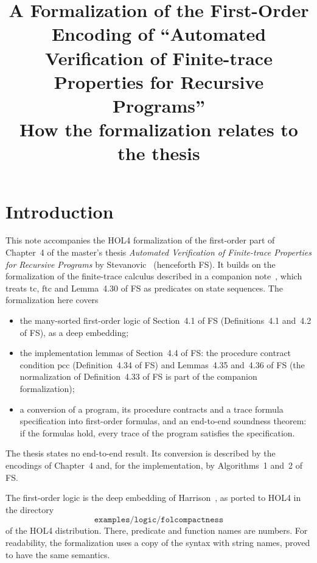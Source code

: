 \documentclass[11pt]{article}
\title{A Formalization of the First-Order Encoding of
  ``Automated Verification of Finite-trace Properties for Recursive
  Programs''\\[0.3em]
  \large How the formalization relates to the thesis}
\author{}
\date{}
\newcommand{\tc}{\mathrm{tc}}
\newcommand{\ftc}{\mathrm{ftc}}
\newcommand{\pcc}{\mathrm{pcc}}
\newcommand{\Th}[1]{#1 of FS}
\theoremstyle{plain}
\theoremstyle{definition}
\theoremstyle{remark}
\begin{document}
\maketitle

\section{Introduction}

This note accompanies the HOL4 formalization of the first-order part of
Chapter~4 of the master's thesis \emph{Automated Verification of
Finite-trace Properties for Recursive Programs} by Stevanovic~\cite{FS}
(henceforth FS). It builds on the formalization of the finite-trace
calculus described in a companion note~\cite{V}, which treats $\tc$,
$\ftc$ and \Th{Lemma~4.30} as predicates on state sequences. The
formalization here covers
\begin{itemize}
\item the many-sorted first-order logic of \Th{Section~4.1}
  (\Th{Definitions~4.1 and~4.2}), as a deep embedding;
\item the implementation lemmas of \Th{Section~4.4}: the procedure contract
  condition $\pcc$ (\Th{Definition~4.34}) and \Th{Lemmas~4.35 and~4.36}
  (the normalization of \Th{Definition~4.33} is part of the companion
  formalization);
\item a conversion of a program, its procedure contracts and a trace
  formula specification into first-order formulas, and an end-to-end
  soundness theorem: if the formulas hold, every trace of the program
  satisfies the specification.
\end{itemize}
The thesis states no end-to-end result. Its conversion is described by
the encodings of Chapter~4 and, for the implementation, by
\Th{Algorithms~1 and~2}.

The first-order logic is the deep embedding of Harrison~\cite{JH}, as
ported to HOL4 in the directory
\[
  \texttt{examples/logic/folcompactness}
\]
of the HOL4 distribution. There, predicate and function names are numbers.
For readability, the formalization uses a copy of the syntax with string
names, proved to have the same semantics.
\end{document}
